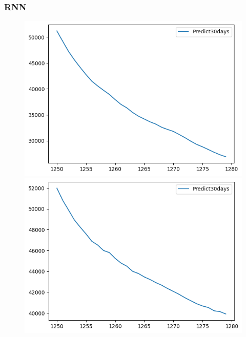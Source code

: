 \subsubsection{RNN}
\begin{figure}[H]
    \centering
    \begin{minipage}{0.15\textwidth}
    \centering
    \includegraphics[width=1\textwidth]{resources/chapter-5/predicted/BIDV_ RNN_7-3_30days.png}
    \end{minipage}
    \hfill
    \begin{minipage}{0.15\textwidth}
    \centering
    \includegraphics[width=1\textwidth]{resources/chapter-5/predicted/BIDV_ RNN_8-2_30days.png}
    \end{minipage}
    \hfill
        \begin{minipage}{0.15\textwidth}

\end{minipage}
\end{figure}
